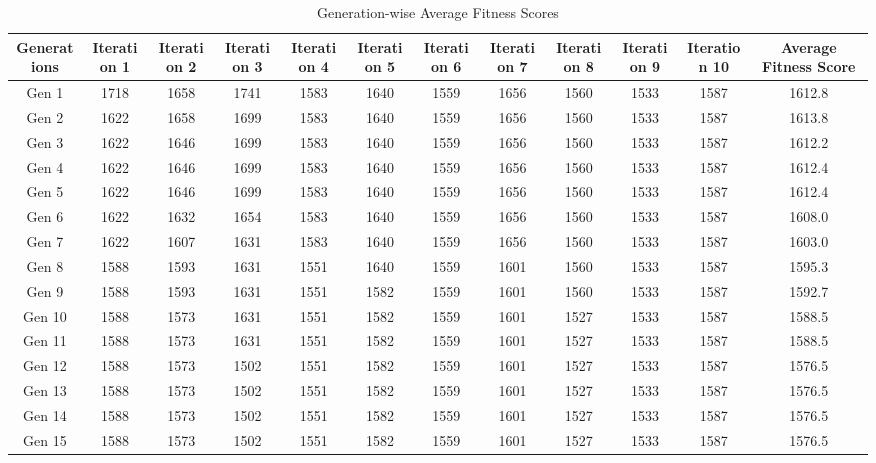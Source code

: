 \documentclass[12pt]{article}
\begin{document}
\begin{table}[h]
    \centering
    \caption{Generation-wise Average Fitness Scores}
    \label{tab:average_fitness_scores}
    \begin{adjustbox}{max width=0.97\textwidth} %
        \begin{tabular}{*{12}{c}}
            \toprule
            Generations & Iteration 1 & Iteration 2 & Iteration 3 & Iteration 4 & Iteration 5 & Iteration 6 & Iteration 7 & Iteration 8 & Iteration 9 & Iteration 10 & Average Fitness Score \\
            \midrule
            Gen 1 & 1718 & 1658 & 1741 & 1583 & 1640 & 1559 & 1656 & 1560 & 1533 & 1587 & 1612.8 \\
            Gen 2 & 1622 & 1658 & 1699 & 1583 & 1640 & 1559 & 1656 & 1560 & 1533 & 1587 & 1613.8 \\
            Gen 3 & 1622 & 1646 & 1699 & 1583 & 1640 & 1559 & 1656 & 1560 & 1533 & 1587 & 1612.2 \\
            Gen 4 & 1622 & 1646 & 1699 & 1583 & 1640 & 1559 & 1656 & 1560 & 1533 & 1587 & 1612.4 \\
            Gen 5 & 1622 & 1646 & 1699 & 1583 & 1640 & 1559 & 1656 & 1560 & 1533 & 1587 & 1612.4 \\
            Gen 6 & 1622 & 1632 & 1654 & 1583 & 1640 & 1559 & 1656 & 1560 & 1533 & 1587 & 1608.0 \\
            Gen 7 & 1622 & 1607 & 1631 & 1583 & 1640 & 1559 & 1656 & 1560 & 1533 & 1587 & 1603.0 \\
            Gen 8 & 1588 & 1593 & 1631 & 1551 & 1640 & 1559 & 1601 & 1560 & 1533 & 1587 & 1595.3 \\
            Gen 9 & 1588 & 1593 & 1631 & 1551 & 1582 & 1559 & 1601 & 1560 & 1533 & 1587 & 1592.7 \\
            Gen 10 & 1588 & 1573 & 1631 & 1551 & 1582 & 1559 & 1601 & 1527 & 1533 & 1587 & 1588.5 \\
            Gen 11 & 1588 & 1573 & 1631 & 1551 & 1582 & 1559 & 1601 & 1527 & 1533 & 1587 & 1588.5 \\
            Gen 12 & 1588 & 1573 & 1502 & 1551 & 1582 & 1559 & 1601 & 1527 & 1533 & 1587 & 1576.5 \\
            Gen 13 & 1588 & 1573 & 1502 & 1551 & 1582 & 1559 & 1601 & 1527 & 1533 & 1587 & 1576.5 \\
            Gen 14 & 1588 & 1573 & 1502 & 1551 & 1582 & 1559 & 1601 & 1527 & 1533 & 1587 & 1576.5 \\
            Gen 15 & 1588 & 1573 & 1502 & 1551 & 1582 & 1559 & 1601 & 1527 & 1533 & 1587 & 1576.5 \\

\end{tabular}
\end{adjustbox}
\end{table}
\end{document}
